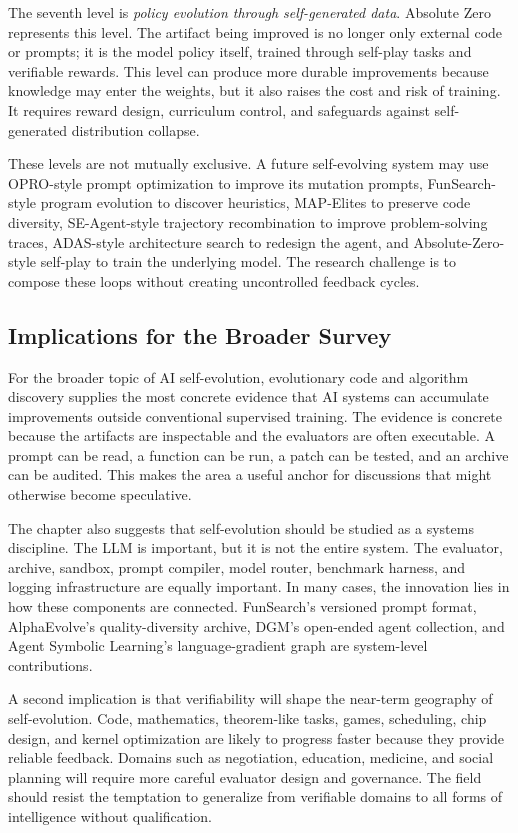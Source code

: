 The seventh level is \emph{policy evolution through self-generated data}.  Absolute Zero represents this level.  The artifact being improved is no longer only external code or prompts; it is the model policy itself, trained through self-play tasks and verifiable rewards.  This level can produce more durable improvements because knowledge may enter the weights, but it also raises the cost and risk of training.  It requires reward design, curriculum control, and safeguards against self-generated distribution collapse.

These levels are not mutually exclusive.  A future self-evolving system may use OPRO-style prompt optimization to improve its mutation prompts, FunSearch-style program evolution to discover heuristics, MAP-Elites to preserve code diversity, SE-Agent-style trajectory recombination to improve problem-solving traces, ADAS-style architecture search to redesign the agent, and Absolute-Zero-style self-play to train the underlying model.  The research challenge is to compose these loops without creating uncontrolled feedback cycles.

\subsection{Implications for the Broader Survey}
\label{subsec:evolution-implications-survey}

For the broader topic of AI self-evolution, evolutionary code and algorithm discovery supplies the most concrete evidence that AI systems can accumulate improvements outside conventional supervised training.  The evidence is concrete because the artifacts are inspectable and the evaluators are often executable.  A prompt can be read, a function can be run, a patch can be tested, and an archive can be audited.  This makes the area a useful anchor for discussions that might otherwise become speculative.

The chapter also suggests that self-evolution should be studied as a systems discipline.  The LLM is important, but it is not the entire system.  The evaluator, archive, sandbox, prompt compiler, model router, benchmark harness, and logging infrastructure are equally important.  In many cases, the innovation lies in how these components are connected.  FunSearch's versioned prompt format, AlphaEvolve's quality-diversity archive, DGM's open-ended agent collection, and Agent Symbolic Learning's language-gradient graph are system-level contributions.

A second implication is that verifiability will shape the near-term geography of self-evolution.  Code, mathematics, theorem-like tasks, games, scheduling, chip design, and kernel optimization are likely to progress faster because they provide reliable feedback.  Domains such as negotiation, education, medicine, and social planning will require more careful evaluator design and governance.  The field should resist the temptation to generalize from verifiable domains to all forms of intelligence without qualification.

